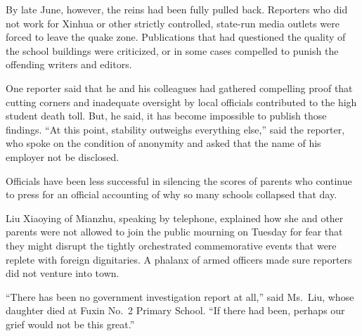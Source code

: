 \documentclass[12pt,a4paper,onecolumn]{article}
\begin{document}
By late June, however, the reins had been fully pulled back. Reporters who did not work for Xinhua
or other strictly controlled, state-run media outlets were forced to leave the quake zone.
Publications that had questioned the quality of the school buildings were criticized, or in some
cases compelled to punish the offending writers and editors.

One reporter said that he and his colleagues had gathered compelling proof that cutting corners and
inadequate oversight by local officials contributed to the high student death toll. But, he said, it
has become impossible to publish those findings. ``At this point, stability outweighs everything
else,'' said the reporter, who spoke on the condition of anonymity and asked that the name of his
employer not be disclosed.

Officials have been less successful in silencing the scores of parents who continue to press for an
official accounting of why so many schools collapsed that day.

Liu Xiaoying of Mianzhu, speaking by telephone, explained how she and other parents were not allowed
to join the public mourning on Tuesday for fear that they might disrupt the tightly orchestrated
commemorative events that were replete with foreign dignitaries. A phalanx of armed officers made
sure reporters did not venture into town.

``There has been no government investigation report at all,'' said Ms.~Liu, whose daughter died at
Fuxin No.~2 Primary School. ``If there had been, perhaps our grief would not be this great.''

\pagebreak
\printindex
\end{document}
